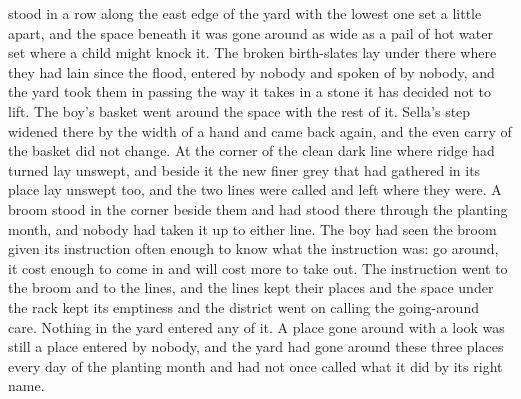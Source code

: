  stood in a row along the east edge of the yard with the lowest one set a little apart, and the space beneath it was gone around as wide as a pail of hot water set where a child might knock it. The broken birth-slates lay under there where they had lain since the flood, entered by nobody and spoken of by nobody, and the yard took them in passing the way it takes in a stone it has decided not to lift. The boy's basket went around the space with the rest of it. Sella's step widened there by the width of a hand and came back again, and the even carry of the basket did not change. At the corner of  the clean dark line where  ridge had turned lay unswept, and beside it the new finer grey that had gathered in its place lay unswept too, and the two lines were called  and left where they were. A broom stood in the corner beside them and had stood there through the planting month, and nobody had taken it up to either line. The boy had seen the broom given its instruction often enough to know what the instruction was: go around, it cost enough to come in and will cost more to take out. The instruction went to the broom and to the lines, and the lines kept their places and the space under the rack kept its emptiness and the district went on calling the going-around care. Nothing in the yard entered any of it. A place gone around with a look was still a place entered by nobody, and the yard had gone around these three places every day of the planting month and had not once called what it did by its right name.

